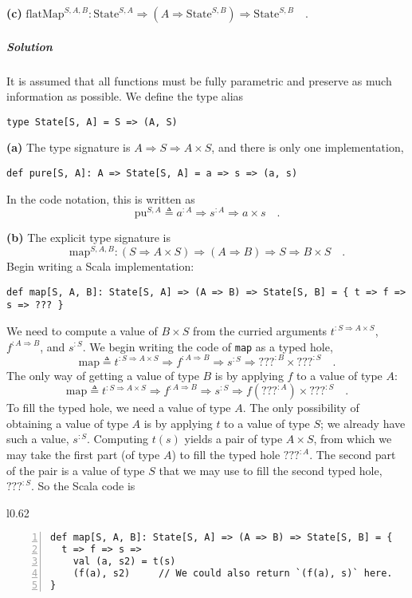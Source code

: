 \textbf{(c)} $\text{flatMap}^{S,A,B}:\text{State}^{S,A}\Rightarrow(A\Rightarrow\text{State}^{S,B})\Rightarrow\text{State}^{S,B}\quad.$

\subparagraph{Solution}

It is assumed that all functions must be fully parametric and preserve
as much information as possible. We define the type alias
\begin{lstlisting}
type State[S, A] = S => (A, S)
\end{lstlisting}

\textbf{(a)} The type signature is $A\Rightarrow S\Rightarrow A\times S$,
and there is only one implementation,
\begin{lstlisting}
def pure[S, A]: A => State[S, A] = a => s => (a, s)
\end{lstlisting}
In the code notation, this is written as
\[
\text{pu}^{S,A}\triangleq a^{:A}\Rightarrow s^{:A}\Rightarrow a\times s\quad.
\]

\textbf{(b)} The explicit type signature is 
\[
\text{map}^{S,A,B}:(S\Rightarrow A\times S)\Rightarrow(A\Rightarrow B)\Rightarrow S\Rightarrow B\times S\quad.
\]
Begin writing a Scala implementation:
\begin{lstlisting}
def map[S, A, B]: State[S, A] => (A => B) => State[S, B] = { t => f => s => ??? }
\end{lstlisting}
We need to compute a value of $B\times S$ from the curried arguments
$t^{:S\Rightarrow A\times S}$, $f^{:A\Rightarrow B}$, and $s^{:S}$.
We begin writing the code of \lstinline!map! as a typed hole,
\[
\text{map}\triangleq t^{:S\Rightarrow A\times S}\Rightarrow f^{:A\Rightarrow B}\Rightarrow s^{:S}\Rightarrow\text{???}^{:B}\times\text{???}^{:S}\quad.
\]
The only way of getting a value of type $B$ is by applying $f$ to
a value of type $A$:
\[
\text{map}\triangleq t^{:S\Rightarrow A\times S}\Rightarrow f^{:A\Rightarrow B}\Rightarrow s^{:S}\Rightarrow f(\text{???}^{:A})\times\text{???}^{:S}\quad.
\]
To fill the typed hole, we need a value of type $A$. The only possibility
of obtaining a value of type $A$ is by applying $t$ to a value of
type $S$; we already have such a value, $s^{:S}$. Computing $t(s)$
yields a pair of type $A\times S$, from which we may take the first
part (of type $A$) to fill the typed hole $\text{???}^{:A}$. The
second part of the pair is a value of type $S$ that we may use to
fill the second typed hole, $\text{???}^{:S}$. So the Scala code
is

\begin{wrapfigure}{l}{0.62\columnwidth}%
\vspace{-0.8\baselineskip}
\begin{lstlisting}[numbers=left,numberstyle={\small}]
def map[S, A, B]: State[S, A] => (A => B) => State[S, B] = {
  t => f => s =>
    val (a, s2) = t(s)
    (f(a), s2)     // We could also return `(f(a), s)` here.
}
\end{lstlisting}
\vspace{-1.25\baselineskip}
\end{wrapfigure}%

